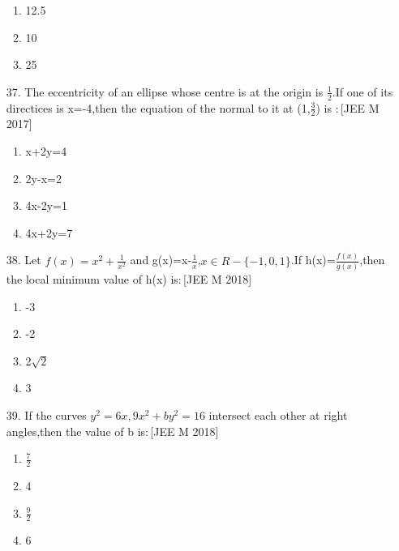 \documentclass[journal,12pt,twocolumn]{IEEEtran}
\theoremstyle{remark}
\begin{document}
\begin{enumerate}
\begin{enumerate}
    \item  12.5\\
    \item  10\\
    \item  25\\
\end{enumerate}
\item[37.]The eccentricity of an ellipse whose centre is at the origin is $\frac{1}{2}$.If one of its directices is x=-4,then the equation of the normal to it at (1,$\frac{3}{2}$) is $:$\hfill[JEE M 2017]\\
\begin{enumerate}
    \item  x+2y=4\\
    \item  2y-x=2\\
    \item  4x-2y=1\\
    \item  4x+2y=7\\
\end{enumerate}
\item[38.] Let $f(x)=x^{2}+\frac{1}{x^2}$ and g(x)=x-$\frac{1}{x}$,$x \in R-{\{-1,0,1}\}$.If h(x)=$\frac{f(x)}{g(x)}$,then the local minimum value of h(x) is$:$\hfill[JEE M 2018]\\
\begin{enumerate}
    \item  -3\\
    \item  -2\\
    \item   2$\sqrt{2}$\\
    \item   3\\
\end{enumerate}
\item[39.] If the curves $y^2=6x,9x^2+by^2=16$ intersect each other at right angles,then the value of b is$:$\hfill[JEE M 2018]\\
\begin{enumerate}
    \item  $\frac{7}{2}$\\
    \item  4\\
    \item  $\frac{9}{2}$\\
    \item  6\\
\end{enumerate}

\end{enumerate}\
\end{document}
